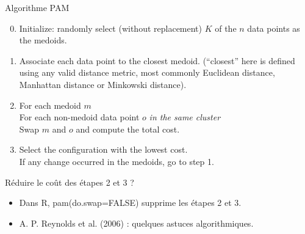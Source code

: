 \begin{frame}{Algorithme PAM}


\begin{enumerate}
\setcounter{enumi}{-1}
\item Initialize: randomly select (without replacement) $K$ of the $n$ data points as the medoids.
\item Associate each data point to the closest medoid. (``closest'' here is defined using any valid distance metric, most commonly Euclidean distance, Manhattan distance or Minkowski distance).
\item For each medoid $m$\\
\quad For each non-medoid data point $o$ \emph{in the same cluster}\\
\quad\quad Swap $m$ and $o$ and compute the total cost.
\item Select the configuration with the lowest cost.\\
If any change occurred in the medoids, go to step 1.
\end{enumerate}

\begin{block}{Réduire le coût des étapes 2 et 3 ?}
\begin{itemize}
\item Dans R, pam(do.swap=FALSE) supprime les étapes 2 et 3.
\item A. P. Reynolds et al. (2006) : quelques astuces algorithmiques.
\end{itemize}
\end{block}

\end{frame}

